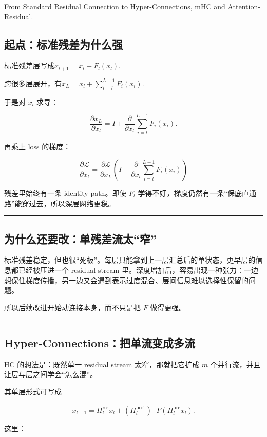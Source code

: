 From Standard Residual Connection to Hyper-Connections, mHC and Attention-Residual.

\subsection{起点：标准残差为什么强}

标准残差层写成\(x_{l+1}=x_l+F_l(x_l)\).

跨很多层展开，有\(x_L = x_l + \sum_{i=l}^{L-1}F_i(x_i)\).

于是对 \(x_l\) 求导：

\[
\frac{\partial x_L}{\partial x_l}
=
I+
\frac{\partial}{\partial x_l}
\sum_{i=l}^{L-1}F_i(x_i).
\]

再乘上 loss 的梯度：

\[
\boxed{
\frac{\partial \mathcal L}{\partial x_l}
=
\frac{\partial \mathcal L}{\partial x_L}
\left(
I+
\frac{\partial}{\partial x_l}
\sum_{i=l}^{L-1}F_i(x_i)
\right)
}
\]

残差里始终有一条 identity path。即使 \(F_l\) 学得不好，梯度仍然有一条“保底直通路”能穿过去，所以深层网络更稳。

\hrule

\subsection{为什么还要改：单残差流太“窄”}

标准残差稳定，但也很“死板”。每层只能拿到上一层汇总后的单状态，更早层的信息都已经被压进一个 residual stream 里。深度增加后，容易出现一种张力：一边想保住梯度传播，另一边又会遇到表示过度混合、层间信息难以选择性保留的问题。

所以后续改进开始动连接本身，而不只是把 \(F\) 做得更强。

\hrule

\subsection{Hyper-Connections：把单流变成多流}

HC 的想法是：既然单一 residual stream 太窄，那就把它扩成 \(m\) 个并行流，并且让层与层之间学会“怎么混”。

其单层形式可写成

\[
x_{l+1}
=
H^{\mathrm{res}}_l x_l
+
(H^{\mathrm{post}}_l)^\top
F\!\left(H^{\mathrm{pre}}_l x_l\right).
\]

这里：

